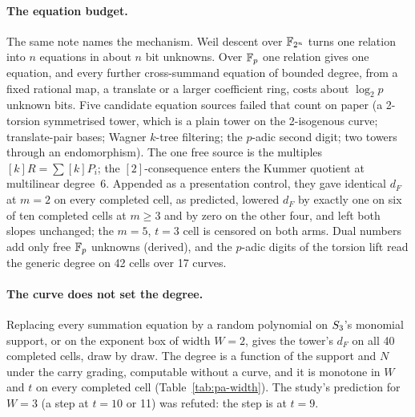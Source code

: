 \paragraph{The equation budget.} The same note names the mechanism. Weil
descent over $\mathbb{F}_{2^n}$ turns one relation into $n$ equations in about $n$
bit unknowns. Over $\mathbb{F}_p$ one relation gives one equation, and every
further cross-summand equation of bounded degree, from a fixed rational
map, a translate or a larger coefficient ring, costs about $\log_2p$ unknown
bits. Five candidate equation sources failed that count on paper (a
2-torsion symmetrised tower, which is a plain tower on the 2-isogenous
curve; translate-pair bases; Wagner $k$-tree filtering; the $p$-adic second
digit; two towers through an endomorphism). The one free source is the
multiples $[k]R=\sum[k]P_i$; the $[2]$-consequence enters the Kummer
quotient at multilinear degree~6. Appended as a presentation control, they gave identical $d_F$ at $m=2$
on every completed cell, as predicted, lowered $d_F$ by exactly one on six of
ten completed cells at $m\ge3$ and by zero on the other four, and left both
slopes unchanged; the $m=5$, $t=3$ cell is censored on both arms. Dual
numbers add only free $\mathbb{F}_p$ unknowns (derived), and the $p$-adic digits
of the torsion lift read the generic degree on 42 cells over 17 curves.

\paragraph{The curve does not set the degree.} Replacing every summation
equation by a random polynomial on $S_{3}$'s monomial support, or on the
exponent box of width $W=2$, gives the tower's $d_F$ on all 40 completed
cells, draw by draw. The degree is a function of the support and $N$ under
the carry grading, computable without a curve, and it is monotone in $W$ and
$t$ on every completed cell (Table~\ref{tab:pa-width}). The study's
prediction for $W=3$ (a step at $t=10$ or 11) was refuted: the step is at
$t=9$.

